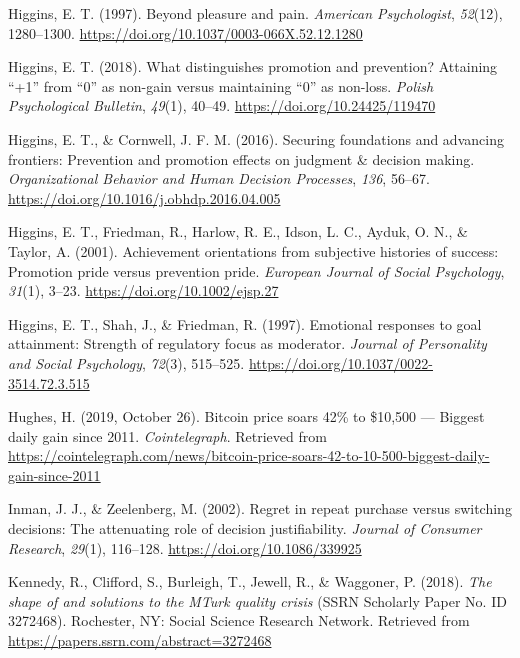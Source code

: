\documentclass[man,floatsintext]{apa6}
\begin{document}
\leavevmode\hypertarget{ref-higgins1997}{}%
Higgins, E. T. (1997). Beyond pleasure and pain. \emph{American Psychologist}, \emph{52}(12), 1280--1300. \url{https://doi.org/10.1037/0003-066X.52.12.1280}

\leavevmode\hypertarget{ref-higgins2018}{}%
Higgins, E. T. (2018). What distinguishes promotion and prevention? Attaining ``+1'' from ``0'' as non-gain versus maintaining ``0'' as non-loss. \emph{Polish Psychological Bulletin}, \emph{49}(1), 40--49. \url{https://doi.org/10.24425/119470}

\leavevmode\hypertarget{ref-higginscornwell2016}{}%
Higgins, E. T., \& Cornwell, J. F. M. (2016). Securing foundations and advancing frontiers: Prevention and promotion effects on judgment \& decision making. \emph{Organizational Behavior and Human Decision Processes}, \emph{136}, 56--67. \url{https://doi.org/10.1016/j.obhdp.2016.04.005}

\leavevmode\hypertarget{ref-higginsetal2001}{}%
Higgins, E. T., Friedman, R., Harlow, R. E., Idson, L. C., Ayduk, O. N., \& Taylor, A. (2001). Achievement orientations from subjective histories of success: Promotion pride versus prevention pride. \emph{European Journal of Social Psychology}, \emph{31}(1), 3--23. \url{https://doi.org/10.1002/ejsp.27}

\leavevmode\hypertarget{ref-higginsetal1997}{}%
Higgins, E. T., Shah, J., \& Friedman, R. (1997). Emotional responses to goal attainment: Strength of regulatory focus as moderator. \emph{Journal of Personality and Social Psychology}, \emph{72}(3), 515--525. \url{https://doi.org/10.1037/0022-3514.72.3.515}

\leavevmode\hypertarget{ref-hughes2019}{}%
Hughes, H. (2019, October 26). Bitcoin price soars 42\% to \$10,500 --- Biggest daily gain since 2011. \emph{Cointelegraph}. Retrieved from \url{https://cointelegraph.com/news/bitcoin-price-soars-42-to-10-500-biggest-daily-gain-since-2011}

\leavevmode\hypertarget{ref-inmanzeelenberg2002}{}%
Inman, J. J., \& Zeelenberg, M. (2002). Regret in repeat purchase versus switching decisions: The attenuating role of decision justifiability. \emph{Journal of Consumer Research}, \emph{29}(1), 116--128. \url{https://doi.org/10.1086/339925}

\leavevmode\hypertarget{ref-kennedyetal2018}{}%
Kennedy, R., Clifford, S., Burleigh, T., Jewell, R., \& Waggoner, P. (2018). \emph{The shape of and solutions to the MTurk quality crisis} (SSRN Scholarly Paper No. ID 3272468). Rochester, NY: Social Science Research Network. Retrieved from \url{https://papers.ssrn.com/abstract=3272468}
\end{document}
